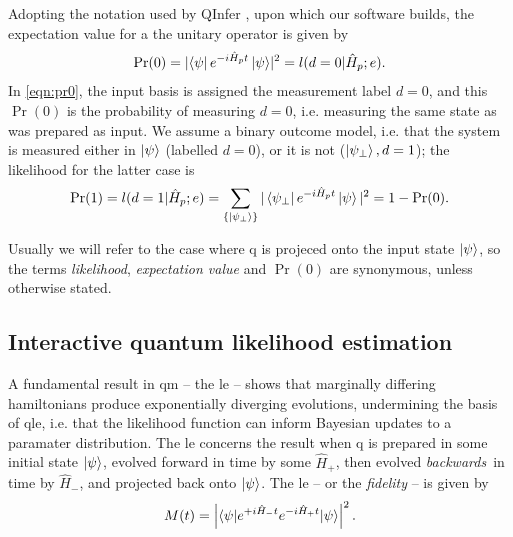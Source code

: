 Adopting the notation used by QInfer \cite{qinfer-1_0}, upon which our software builds, 
    the \gls{expectation value} for a the unitary operator is given by
\begin{equation}\label{eqn:pr0}
    \Pr(0) =  \lvert \bra{\psi} e^{-i \hat{H}_p t} \ket{\psi}\rvert^2  = l(d=0 | \hat{H}_p; e).
\end{equation}
In \cref{eqn:pr0}, the input basis is assigned the measurement label $d=0$, and this $\Pr(0)$ is the probability 
    of measuring $d=0$, i.e. measuring the same state as was prepared as input. 
We assume a binary outcome model\footnotemark, 
    i.e. that the system is measured either in $\ket{\psi}$ (labelled $d=0$), or it is not ($\ket{\psi_{\perp}}, d=1$);
    the \gls{likelihood} for the latter case is
\begin{equation}\label{eqn:pr1}
    \Pr(1) = l(d=1 | \hat{H}_p; e) = \sum_{\{\ket{\psi_{\perp}}\}} | \bra{\psi_{\perp}} e^{-i \hat{H}_p t} \ket{\psi}  |^2 = 1 - \Pr(0).
\end{equation}

\par 
Usually we will refer to the case where \gls{q} is projeced onto the input state $\ket{\psi}$, 
    so the terms \emph{likelihood}, \emph{\gls{expectation value}} and \emph{$\Pr(0)$} are synonymous, 
    unless otherwise stated. 


\subsection{Interactive quantum likelihood estimation}\label{sec:iqle}
A fundamental result in \gls{qm} -- the \gls{le} -- shows that marginally differing \glspl{hamiltonian} 
    produce exponentially diverging evolutions,  undermining the basis of \gls{qle}, 
    i.e. that the likelihood function can inform Bayesian updates to a paramater distribution. 
The \gls{le} concerns the result when \gls{q} is prepared in some initial state $\ket{\psi}$, 
    evolved forward in time by some $\hat{H}_+$, then evolved \emph{backwards}\footnotemark \ in time by $\hat{H}_{-}$,
    and projected back onto $\ket{\psi}$. 
The \gls{le} -- or the \emph{fidelity} -- is given by 
\begin{equation}
    \label{eqn:loschmidt_echo}
    M(t) = \left\lvert  \braket{ \psi | e^{+i\hat{H}_{-} t} e^{-i \hat{H}_{+} t} | \psi}  \right\rvert^2.
\end{equation}
\par


